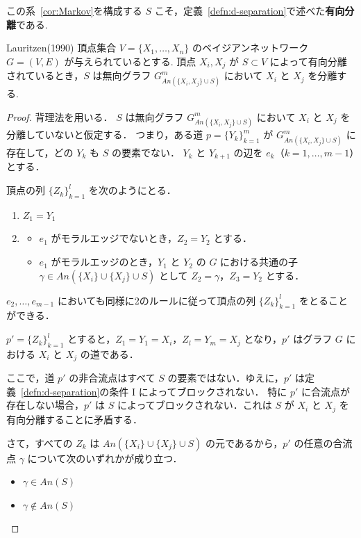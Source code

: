 \documentclass[uplatex, dvipdfmx]{jsarticle}
\begin{document}
この系~\ref{cor:Markov}を構成する $S$ こそ，定義~\ref{defn:d-separation}で述べた\textbf{有向分離}である.

\begin{thm}[label={thm:LauritzenForward}]{Lauritzen(1990)}
  頂点集合 $V = \{X_1, \dots, X_n\}$ のベイジアンネットワーク $G = (V, E)$ が与えられているとする.
  頂点 $X_i, X_j$ が $S \subset V$ によって有向分離されているとき，$S$ は無向グラフ $G^m_{An(\{X_i, X_j\} \cup S)}$ において $X_i$ と $X_j$ を分離する.
\end{thm}

\begin{proof}
  背理法を用いる．
  $S$ は無向グラフ $G^m_{An(\{X_i, X_j\} \cup S)}$ において $X_i$ と $X_j$ を分離していないと仮定する．
  つまり，ある道 $p = \{Y_k\}_{k=1}^m$ が $G^m_{An(\{X_i, X_j\} \cup S)}$ に存在して，どの $Y_k$ も $S$ の要素でない．
  $Y_k$ と $Y_{k+1}$ の辺を $e_k$（$k = 1, \dots, m-1$）とする．

  頂点の列 $\{Z_k\}_{k=1}^l$ を次のようにとる．
  \begin{enumerate}
    \item $Z_1 = Y_1$
    \item \begin{itemize}
      \item $e_1$ がモラルエッジでないとき，$Z_2 = Y_2$ とする．
      \item $e_1$ がモラルエッジのとき，$Y_1$ と $Y_2$ の $G$ における共通の子 $\gamma \in An(\{X_i\} \cup \{X_j\} \cup S)$ として $Z_2 = \gamma$，$Z_3 = Y_2$ とする．
    \end{itemize}
  \end{enumerate}
  $e_2, \dots, e_{m-1}$ においても同様に2のルールに従って頂点の列 $\{Z_k\}_{k=1}^l$ をとることができる．

  $p' = \{Z_k\}_{k=1}^l$ とすると，$Z_1 = Y_1 = X_i$，$Z_l = Y_m = X_j$ となり，$p'$ はグラフ $G$ における $X_i$ と $X_j$ の道である．

  ここで，道 $p'$ の非合流点はすべて $S$ の要素ではない．ゆえに，$p'$ は定義~\ref{defn:d-separation}の条件 I によってブロックされない．
  特に $p'$ に合流点が存在しない場合，$p'$ は $S$ によってブロックされない．これは $S$ が $X_i$ と $X_j$ を有向分離することに矛盾する．

  さて，すべての $Z_k$ は $An(\{X_i\} \cup \{X_j\} \cup S)$ の元であるから，$p'$ の任意の合流点 $\gamma$ について次のいずれかが成り立つ．
  \begin{itemize}
    \item[a)] $\gamma \in An(S)$
    \item[b)] $\gamma \notin An(S)$
  \end{itemize}


\end{proof}
\end{document}
